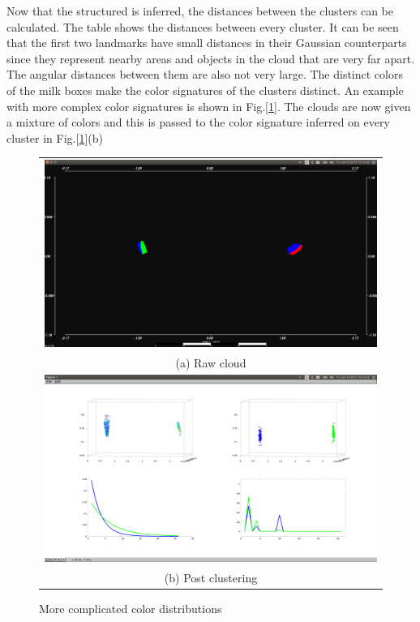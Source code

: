 \documentclass[twoside,hidelinks]{article}
\begin{document}
Now that the structured is inferred, the distances between the clusters can be calculated. The table shows the distances between every cluster. It can be seen that the first two landmarks have small distances in their Gaussian counterparts since they represent nearby areas and objects in the cloud that are very far apart. The angular distances between them are also not very large. The distinct colors of the milk boxes make the color signatures of the clusters distinct. An example with more complex color signatures is shown in Fig.[\ref{pcl:clust2}]. The clouds are now given a mixture of colors and this is passed to the color signature inferred on every cluster in Fig.[\ref{pcl:clust2}](b)



\begin{figure}
\begin{tabular}{c}
  \includegraphics[width=1\textwidth]{clusterings/coloursSource} \\
  (a) Raw cloud  \\
   \includegraphics[width=1\textwidth]{clusterings/coloursCorrect} \\
 (b) Post clustering \\[6pt]
\end{tabular}
\caption{More complicated color distributions}
  \label{pcl:clust2}
\end{figure}
\end{document}
